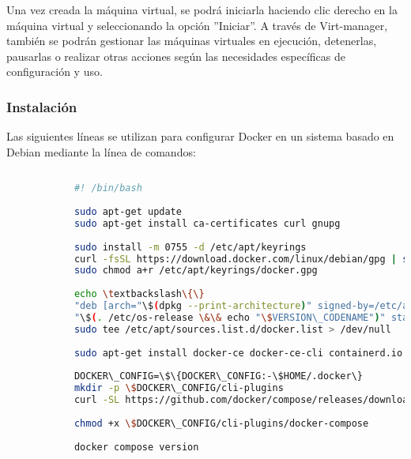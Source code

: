 			Una vez creada la máquina virtual, se podrá iniciarla haciendo clic derecho en la máquina virtual y seleccionando la opción ''Iniciar''. A través de Virt-manager, también se podrán gestionar las máquinas virtuales en ejecución, detenerlas, pausarlas o realizar otras acciones según las necesidades específicas de configuración y uso.
			
			
			\subsubsection{Instalación}
			Las siguientes líneas se utilizan para configurar Docker en un sistema basado en Debian mediante la línea de comandos:
			\begin{lstlisting}[language=Bash, caption=docker]
				
			#! /bin/bash
			
			sudo apt-get update
			sudo apt-get install ca-certificates curl gnupg
			
			sudo install -m 0755 -d /etc/apt/keyrings
			curl -fsSL https://download.docker.com/linux/debian/gpg | sudo gpg --dearmor -o /etc/apt/keyrings/docker.gpg
			sudo chmod a+r /etc/apt/keyrings/docker.gpg
			
			echo \textbackslash\{\}
			"deb [arch="\$(dpkg --print-architecture)" signed-by=/etc/apt/keyrings/docker.gpg] https://download.docker.com/linux/debian \textbackslash\{\}
			"\$(. /etc/os-release \&\& echo "\$VERSION\_CODENAME")" stable" | \textbackslash\{\}
			sudo tee /etc/apt/sources.list.d/docker.list > /dev/null
			
			sudo apt-get install docker-ce docker-ce-cli containerd.io docker-buildx-plugin docker-compose-plugin
			
			DOCKER\_CONFIG=\$\{DOCKER\_CONFIG:-\$HOME/.docker\}
			mkdir -p \$DOCKER\_CONFIG/cli-plugins
			curl -SL https://github.com/docker/compose/releases/download/v2.20.0/docker-compose-linux-x86\_64 -o \$DOCKER\_CONFIG/cli-plugins/docker-compose
			
			chmod +x \$DOCKER\_CONFIG/cli-plugins/docker-compose
			
			docker compose version
			
		\end{lstlisting}
		
